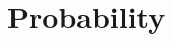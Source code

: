          \chapter{Probability}
    \setcounter{figure}{1}
    \setcounter{subfigure}{1}
    \label{0bb9905f9f275884255abbf74a951a4a}
    
    
    
    
       
%     
%     
%     
%     
%     
%     
%   
%             
%       
